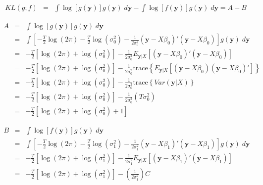 \documentclass[12pt]{article}
\theoremstyle{definition}
\begin{document}
\begin{eqnarray*}
	KL(g;f)&=& \int \log[g(\mathbf{y})] g(\mathbf{y}) \; d \mathbf{y} - \int \log[f(\mathbf{y})]g(\mathbf{y}) \; d \mathbf{y} =  A - B 
\end{eqnarray*}



\begin{eqnarray*}
	A &=&\int \log[g(\mathbf{y})] g(\mathbf{y}) \; d \mathbf{y} \\
	&=& \int \left[-\frac{T}{2}\log(2\pi) -\frac{T}{2} \log(\sigma^2_0) - \frac{1}{2\sigma_0^2}\left(\textbf{y} - X\beta_0\right)'\left(\textbf{y} -X\beta_0\right) \right] g(\mathbf{y})\; d\mathbf{y}\\
	&=& -\frac{T}{2}\left[ \log(2\pi) + \log(\sigma^2_0)\right] -  \frac{1}{2\sigma_0^2} E_{\mathbf{y}|X}\left[\left(\textbf{y} - X\beta_0\right)'\left(\textbf{y} -X\beta_0\right)\right]\\
	&=& -\frac{T}{2}\left[ \log(2\pi) + \log(\sigma^2_0)\right] -  \frac{1}{2\sigma_0^2}\mbox{trace}\left\{ E_{\mathbf{y}|X}\left[\left(\textbf{y} - X\beta_0\right)\left(\textbf{y} -X\beta_0\right)'\right]\right\}\\
	&=& -\frac{T}{2}\left[ \log(2\pi) + \log(\sigma^2_0)\right] -  \frac{1}{2\sigma_0^2}\mbox{trace}\left\{ Var(\mathbf{y}|X)\right\}\\
	&=& -\frac{T}{2}\left[ \log(2\pi) + \log(\sigma^2_0)\right] -  \frac{1}{2\sigma_0^2}\left(T \sigma_0^2\right)\\
	&=& -\frac{T}{2}\left[ \log(2\pi) + \log(\sigma^2_0) +  1 \right]
\end{eqnarray*}


\begin{eqnarray*}
	B &=& \int \log[f(\mathbf{y})] g(\mathbf{y}) \; d \mathbf{y}\\
	&=& \int \left[ -\frac{T}{2}\log(2\pi) -\frac{T}{2} \log(\sigma^2_1) - \frac{1}{2\sigma_1^2}\left(\textbf{y} - X\beta_1\right)'\left(\textbf{y} -X\beta_1\right) \right] g(\mathbf{y})\;  d \mathbf{y}\\
		&=& -\frac{T}{2}\left[\log(2\pi) + \log(\sigma^2_1) \right]- \frac{1}{2\sigma_1^2}E_{\mathbf{y}|X}\left[\left(\textbf{y} - X\beta_1\right)'\left(\textbf{y} -X\beta_1\right)\right]\\
		&=&  -\frac{T}{2}\left[\log(2\pi) + \log(\sigma^2_1) \right] - \left(\frac{1}{2\sigma_1^2}\right)C
\end{eqnarray*}
\end{document}
